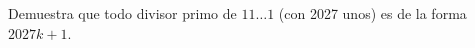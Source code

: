 \begin{problem}
    Demuestra que todo divisor primo de $11\ldots1$ (con 2027 unos) es de la forma $2027k+1$.
    \label{25EN2_2_4}
\end{problem}